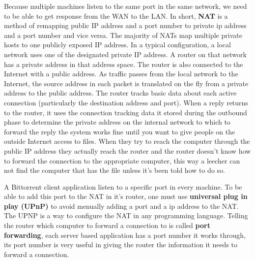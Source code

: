 \documentclass[11pt]{article}
\begin{document}
  \begin{flushleft}

    Because multiple machines listen to the same port in the same network, we need to be able to get response from the WAN to the LAN. In short, \textbf{NAT} is a method of remapping public IP address and a port number to private ip address and a port number and vice versa. The majority of NATs map multiple private hosts to one publicly exposed IP address. In a typical configuration, a local network uses one of the designated private IP address. A router on that network has a private address in that address space. The router is also connected to the Internet with a public address. As traffic passes from the local network to the Internet, the source address in each packet is translated on the fly from a private address to the public address. The router tracks basic data about each active connection (particularly the destination address and port). When a reply returns to the router, it uses the connection tracking data it stored during the outbound phase to determine the private address on the internal network to which to forward the reply the system works fine until you want to give people on the outside Internet access to files. When they try to reach the computer through the public IP address they actually reach the router and the router doesn't know how to forward the connection to the appropriate computer, this way a leecher can not find the computer that has the file unless it's been told how to do so.

    A Bittorrent client application listen to a specific port in every machine. To be able to add this port to the NAT in it's router, one must use \textbf{universal plug in play (UPnP)} to avoid menually adding a port and a ip address to the NAT. The UPNP is a way to configure the NAT in any programming language. Telling the router which computer to forward a connection to is called \textbf{port forwarding}, each server based application has a port number it works through, its port number is very useful in giving the router the information it needs to forward a connection.

  \end{flushleft}
\end{document}
